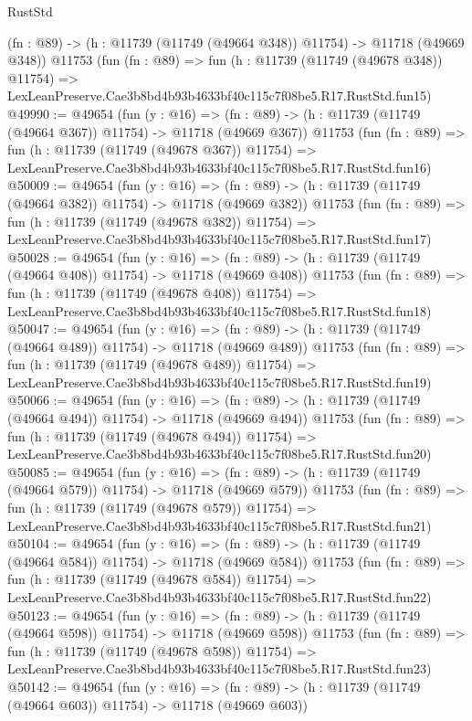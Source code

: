 \begin{lexlean}{RustStd}
\begin{coremodule}
    (fn : @89) -> (h : @11739 (@11749 (@49664 @348)) @11754) -> @11718 (@49669 @348))
    @11753
    (fun (fn : @89) =>
    fun (h : @11739 (@11749 (@49678 @348)) @11754) =>
    LexLeanPreserve.Cae3b8bd4b93b4633bf40c115c7f08be5.R17.RustStd.fun15)
@49990 := @49654
    (fun (y : @16) =>
    (fn : @89) -> (h : @11739 (@11749 (@49664 @367)) @11754) -> @11718 (@49669 @367))
    @11753
    (fun (fn : @89) =>
    fun (h : @11739 (@11749 (@49678 @367)) @11754) =>
    LexLeanPreserve.Cae3b8bd4b93b4633bf40c115c7f08be5.R17.RustStd.fun16)
@50009 := @49654
    (fun (y : @16) =>
    (fn : @89) -> (h : @11739 (@11749 (@49664 @382)) @11754) -> @11718 (@49669 @382))
    @11753
    (fun (fn : @89) =>
    fun (h : @11739 (@11749 (@49678 @382)) @11754) =>
    LexLeanPreserve.Cae3b8bd4b93b4633bf40c115c7f08be5.R17.RustStd.fun17)
@50028 := @49654
    (fun (y : @16) =>
    (fn : @89) -> (h : @11739 (@11749 (@49664 @408)) @11754) -> @11718 (@49669 @408))
    @11753
    (fun (fn : @89) =>
    fun (h : @11739 (@11749 (@49678 @408)) @11754) =>
    LexLeanPreserve.Cae3b8bd4b93b4633bf40c115c7f08be5.R17.RustStd.fun18)
@50047 := @49654
    (fun (y : @16) =>
    (fn : @89) -> (h : @11739 (@11749 (@49664 @489)) @11754) -> @11718 (@49669 @489))
    @11753
    (fun (fn : @89) =>
    fun (h : @11739 (@11749 (@49678 @489)) @11754) =>
    LexLeanPreserve.Cae3b8bd4b93b4633bf40c115c7f08be5.R17.RustStd.fun19)
@50066 := @49654
    (fun (y : @16) =>
    (fn : @89) -> (h : @11739 (@11749 (@49664 @494)) @11754) -> @11718 (@49669 @494))
    @11753
    (fun (fn : @89) =>
    fun (h : @11739 (@11749 (@49678 @494)) @11754) =>
    LexLeanPreserve.Cae3b8bd4b93b4633bf40c115c7f08be5.R17.RustStd.fun20)
@50085 := @49654
    (fun (y : @16) =>
    (fn : @89) -> (h : @11739 (@11749 (@49664 @579)) @11754) -> @11718 (@49669 @579))
    @11753
    (fun (fn : @89) =>
    fun (h : @11739 (@11749 (@49678 @579)) @11754) =>
    LexLeanPreserve.Cae3b8bd4b93b4633bf40c115c7f08be5.R17.RustStd.fun21)
@50104 := @49654
    (fun (y : @16) =>
    (fn : @89) -> (h : @11739 (@11749 (@49664 @584)) @11754) -> @11718 (@49669 @584))
    @11753
    (fun (fn : @89) =>
    fun (h : @11739 (@11749 (@49678 @584)) @11754) =>
    LexLeanPreserve.Cae3b8bd4b93b4633bf40c115c7f08be5.R17.RustStd.fun22)
@50123 := @49654
    (fun (y : @16) =>
    (fn : @89) -> (h : @11739 (@11749 (@49664 @598)) @11754) -> @11718 (@49669 @598))
    @11753
    (fun (fn : @89) =>
    fun (h : @11739 (@11749 (@49678 @598)) @11754) =>
    LexLeanPreserve.Cae3b8bd4b93b4633bf40c115c7f08be5.R17.RustStd.fun23)
@50142 := @49654
    (fun (y : @16) =>
    (fn : @89) -> (h : @11739 (@11749 (@49664 @603)) @11754) -> @11718 (@49669 @603))

\end{coremodule}
\end{lexlean}

